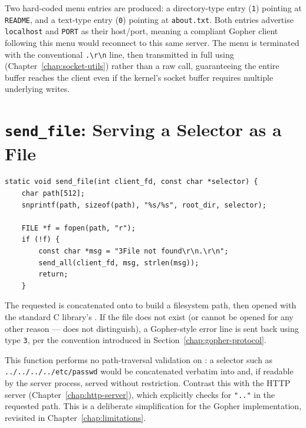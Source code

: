 Two hard-coded menu entries are produced: a directory-type entry (\texttt{1}) pointing at \texttt{README}, and a text-type entry (\texttt{0}) pointing at \texttt{about.txt}. Both entries advertise \texttt{localhost} and \texttt{PORT} as their host/port, meaning a compliant Gopher client following this menu would reconnect to this same server. The menu is terminated with the conventional \texttt{.\textbackslash r\textbackslash n} line, then transmitted in full using  (Chapter~\ref{chap:socket-utils}) rather than a raw  call, guaranteeing the entire buffer reaches the client even if the kernel's socket buffer requires multiple underlying writes.

\section{\texttt{send\_file}: Serving a Selector as a File}

\begin{lstlisting}[style=cstyle]
static void send_file(int client_fd, const char *selector) {
    char path[512];
    snprintf(path, sizeof(path), "%s/%s", root_dir, selector);

    FILE *f = fopen(path, "r");
    if (!f) {
        const char *msg = "3File not found\r\n.\r\n";
        send_all(client_fd, msg, strlen(msg));
        return;
    }
\end{lstlisting}

The requested  is concatenated onto  to build a filesystem path, then opened with the standard C library's . If the file does not exist (or cannot be opened for any other reason ---  does not distinguish), a Gopher-style error line is sent back using type \texttt{3}, per the convention introduced in Section~\ref{chap:gopher-protocol}.

\begin{warnbox}
This function performs no path-traversal validation on : a selector such as \texttt{../../../../etc/passwd} would be concatenated verbatim into  and, if readable by the server process, served without restriction. Contrast this with the HTTP server (Chapter~\ref{chap:http-server}), which explicitly checks for \texttt{".."} in the requested path. This is a deliberate simplification for the Gopher implementation, revisited in Chapter~\ref{chap:limitations}.
\end{warnbox}

